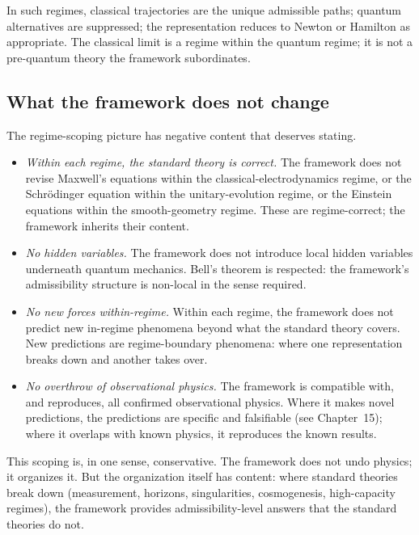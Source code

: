 \documentclass[11pt]{article}
\begin{document}
\noindent In such regimes, classical trajectories are the unique admissible paths; quantum alternatives are suppressed; the representation reduces to Newton or Hamilton as appropriate. The classical limit is a regime within the quantum regime; it is not a pre-quantum theory the framework subordinates.

\subsection{What the framework does not change}\label{sec:framework_no_change}

The regime-scoping picture has negative content that deserves stating.

\begin{itemize}
    \item \emph{Within each regime, the standard theory is correct.} The framework does not revise Maxwell's equations within the classical-electrodynamics regime, or the Schr\"odinger equation within the unitary-evolution regime, or the Einstein equations within the smooth-geometry regime. These are regime-correct; the framework inherits their content.
    \item \emph{No hidden variables.} The framework does not introduce local hidden variables underneath quantum mechanics. Bell's theorem is respected: the framework's admissibility structure is non-local in the sense required.
    \item \emph{No new forces within-regime.} Within each regime, the framework does not predict new in-regime phenomena beyond what the standard theory covers. New predictions are regime-boundary phenomena: where one representation breaks down and another takes over.
    \item \emph{No overthrow of observational physics.} The framework is compatible with, and reproduces, all confirmed observational physics. Where it makes novel predictions, the predictions are specific and falsifiable (see Chapter~15); where it overlaps with known physics, it reproduces the known results.
\end{itemize}

\noindent This scoping is, in one sense, conservative. The framework does not undo physics; it organizes it. But the organization itself has content: where standard theories break down (measurement, horizons, singularities, cosmogenesis, high-capacity regimes), the framework provides admissibility-level answers that the standard theories do not.
\end{document}

